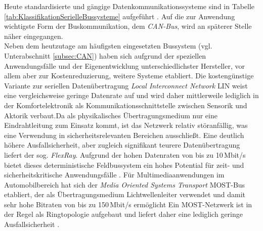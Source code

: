 Heute standardisierte und gängige Datenkommunikationssysteme sind in Tabelle \ref{tab:KlassifikationSerielleBussysteme} aufgeführt \cite{VectorInformatikGmbH.b}. Auf die zur Anwendung wichtigste Form der Buskommunikation, dem \emph{\acs{CAN}-Bus}, wird an späterer Stelle näher eingegangen. \\
Neben dem heutzutage am häufigsten eingesetzten Bussystem (vgl. Unterabschnitt \ref{subsec:CAN}) haben sich aufgrund der speziellen Anwendungsfälle und der Eigenentwicklung unterschiedlichster Hersteller, vor allem aber zur Kostenreduzierung, weitere Systeme etabliert. Die kostengünstige Variante zur seriellen Datenübertragung \emph{Local Interconnect Network} \acs{LIN} weist eine vergleichsweise geringe Datenrate auf und wird daher mittlerweile lediglich in der Komfortelektronik als Kommunikationsschnittstelle zwischen Sensorik und Aktorik verbaut.Da als physikalisches Übertragungsmedium nur eine Eindrahtleitung zum Einsatz kommt, ist das Netzwerk relativ störanfällig, was eine Verwendung in sicherheitsrelevanten Bereichen ausschließt. Eine deutlich höhere Ausfallsicherheit, aber zugleich signifikant teurere Datenübertragung liefert der sog. \emph{FlexRay}. Aufgrund der hohen Datenraten von bis zu 10\,Mbit/s bietet dieses deterministische Feldbussystem ein hohes Potential für zeit- und sicherheitskritische Anwendungsfälle \cite{VectorInformatikGmbH.c}. Für Multimediaanwendungen im Automobilbereich hat sich der \emph{Media Oriented Systems Transport} \acs{MOST}-Bus etabliert, der als Übertragungsmedium Lichtwellenleiter verwendet und damit sehr hohe Bitraten von bis zu 150\,Mbit/s ermöglicht Ein MOST-Netzwerk ist in der Regel als Ringtopologie aufgebaut und liefert daher eine lediglich geringe Ausfallsicherheit \cite{Schuller.20.01.2005}.\\


